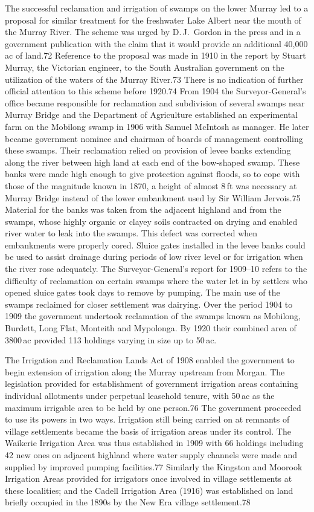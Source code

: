 The successful reclamation and irrigation of swamps on the lower
Murray led to a proposal for similar treatment for the freshwater Lake
Albert near the mouth of the Murray River.  The scheme was urged by
D.\,J.~Gordon in the press and in a government publication with the
claim that it would provide an additional 40,000\,ac of land.72
Reference to the proposal was made in 1910 in the report by Stuart
Murray, the Victorian engineer, to the South Australian government on
the utilization of the waters of the Murray River.73 There is no
indication of further official attention to this scheme before 1920.74
From 1904 the Surveyor-General's office became responsible for
reclamation and subdivision of several swamps near Murray Bridge and
the Department of Agriculture established an experimental farm on the
Mobilong swamp in 1906 with Samuel McIntosh as manager. He later
became government nominee and chairman of boards of management
controlling these swamps. Their reclamation relied on provision of
levee banks extending along the river between high land at each end of
the bow-shaped swamp. These banks were made high enough to give
protection against floods, so to cope with those of the magnitude
known in 1870, a height of almost 8\,ft was necessary at Murray Bridge
instead of the lower embankment used by Sir William Jervois.75
Material for the banks was taken from the adjacent highland and from
the swamps, whose highly organic or clayey soils contracted on drying
and enabled river water to leak into the swamps.  This defect was
corrected when embankments were properly cored.  Sluice gates
installed in the levee banks could be used to assist drainage during
periods of low river level or for irrigation when the river rose
adequately. The Surveyor-General's report for 1909--10 refers to the
difficulty of reclamation on certain swamps where the water let in by
settlers who opened sluice gates took days to remove by pumping.  The
main use of the swamps reclaimed for closer settlement was dairying.
Over the period 1904 to 1909 the government undertook reclamation of
the swamps known as Mobilong, Burdett, Long Flat, Monteith and
Mypolonga.  By 1920 their combined area of 3800\,ac provided 113
holdings varying in size up to 50\,ac.

The Irrigation and Reclamation Lands Act of 1908 enabled the
government to begin extension of irrigation along the Murray upstream
from Morgan.  The legislation provided for establishment of government
irrigation areas containing individual allotments under perpetual
leasehold tenure, with 50\,ac as the maximum irrigable area to be held
by one person.76 The government proceeded to use its powers in two
ways.  Irrigation still being carried on at remnants of village
settlements became the basis of irrigation areas under its control.
The Waikerie Irrigation Area was thus established in 1909 with 66
holdings including 42 new ones on adjacent highland where water supply
channels were made and supplied by improved pumping facilities.77
Similarly the Kingston and Moorook Irrigation Areas provided for
irrigators once involved in village settlements at these localities;
and the Cadell Irrigation Area (1916) was established on land briefly
occupied in the 1890s by the New Era village settlement.78

